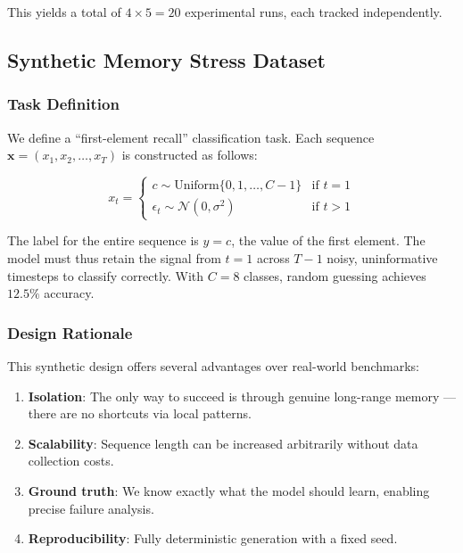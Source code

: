 \documentclass[12pt, a4paper]{article}
\begin{document}
This yields a total of $4 \times 5 = 20$ experimental runs, each tracked independently.

\subsection{Synthetic Memory Stress Dataset}

\subsubsection{Task Definition}

We define a ``first-element recall'' classification task. Each sequence $\mathbf{x} = (x_1, x_2, \ldots, x_T)$ is constructed as follows:

\begin{equation}
    x_t = \begin{cases}
        c \sim \text{Uniform}\{0, 1, \ldots, C-1\} & \text{if } t = 1 \\
        \epsilon_t \sim \mathcal{N}(0, \sigma^2) & \text{if } t > 1
    \end{cases}
    \label{eq:dataset}
\end{equation}

The label for the entire sequence is $y = c$, the value of the first element. The model must thus retain the signal from $t=1$ across $T-1$ noisy, uninformative timesteps to classify correctly. With $C = 8$ classes, random guessing achieves $12.5\%$ accuracy.

\subsubsection{Design Rationale}

This synthetic design offers several advantages over real-world benchmarks:

\begin{enumerate}[leftmargin=2em]
    \item \textbf{Isolation}: The only way to succeed is through genuine long-range memory — there are no shortcuts via local patterns.
    \item \textbf{Scalability}: Sequence length can be increased arbitrarily without data collection costs.
    \item \textbf{Ground truth}: We know exactly what the model should learn, enabling precise failure analysis.
    \item \textbf{Reproducibility}: Fully deterministic generation with a fixed seed.
\end{enumerate}
\end{document}
